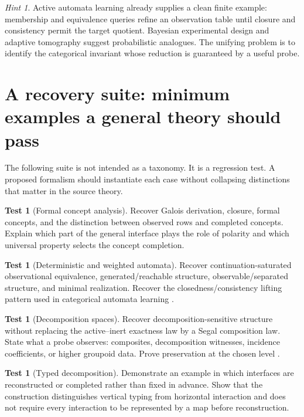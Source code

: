 \documentclass[11pt]{article}
\theoremstyle{definition}
\newtheorem{test}[theorem]{Test}
\theoremstyle{remark}
\newtheorem{hint}[theorem]{Hint}
\begin{document}
\begin{hint}
Active automata learning already supplies a clean finite example: membership and equivalence queries refine an observation table until closure and consistency permit the target quotient. Bayesian experimental design and adaptive tomography suggest probabilistic analogues. The unifying problem is to identify the categorical invariant whose reduction is guaranteed by a useful probe.
\end{hint}

\section{A recovery suite: minimum examples a general theory should pass}

The following suite is not intended as a taxonomy. It is a regression test. A proposed formalism should instantiate each case without collapsing distinctions that matter in the source theory.

\begin{test}[Formal concept analysis]
Recover Galois derivation, closure, formal concepts, and the distinction between observed rows and completed concepts. Explain which part of the general interface plays the role of polarity and which universal property selects the concept completion.
\end{test}

\begin{test}[Deterministic and weighted automata]
Recover continuation-saturated observational equivalence, generated/reachable structure, observable/separated structure, and minimal realization. Recover the closedness/consistency lifting pattern used in categorical automata learning \cite{CALF2017}.
\end{test}

\begin{test}[Decomposition spaces]
Recover decomposition-sensitive structure without replacing the active--inert exactness law by a Segal composition law. State what a probe observes: composites, decomposition witnesses, incidence coefficients, or higher groupoid data. Prove preservation at the chosen level \cite{GKT2018}.
\end{test}

\begin{test}[Typed decomposition]
Demonstrate an example in which interfaces are reconstructed or completed rather than fixed in advance. Show that the construction distinguishes vertical typing from horizontal interaction and does not require every interaction to be represented by a map before reconstruction.
\end{test}
\end{document}
